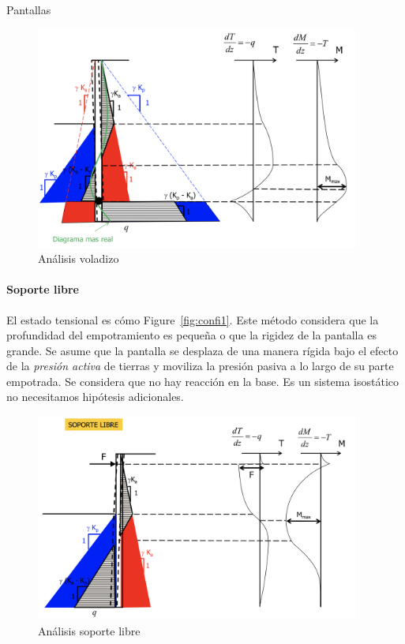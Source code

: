 \begin{mybox}{Pantallas}
	\begin{figure}[H]
		\centering
		\includegraphics[width=0.95\textwidth]{img/voladizo}
		\caption{Análisis voladizo}
		\label{fig:voladizo}
	\end{figure}

	\paragraph{Soporte libre} %
	\label{par:soporte_libre}
	El estado tensional es cómo Figure~\ref{fig:confi1}. Este método considera que la profundidad del empotramiento es pequeña o que la rigidez de la pantalla es grande. Se asume que la pantalla se desplaza de una manera rígida bajo el efecto de la \emph{presión activa} de tierras y moviliza la presión pasiva a lo largo de su parte empotrada. Se considera que no hay reacción en la base. Es un sistema isostático no necesitamos hipótesis adicionales.
	\begin{figure}[H]
		\centering
		\includegraphics[width=0.95\textwidth]{img/soporte_libre}
		\caption{Análisis soporte libre}
		\label{fig:soporte_libre}
	\end{figure}


\end{mybox}
